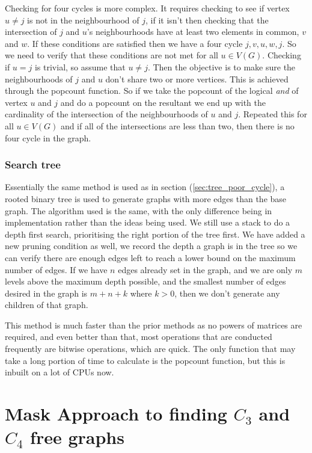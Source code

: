 \documentclass[a4paper]{article}
\begin{document}
Checking for four cycles is more complex. It requires checking to see if vertex $u\not= j$ is not in the neighbourhood of $j$, if it isn't then checking that the intersection of $j$ and $u$'s neighbourhoods have at least two elements in common, $v$ and $w$. If these conditions are satisfied then we have a four cycle $j,v,u,w,j$. So we need to verify that these conditions are not met for all $u\in V(G)$. Checking if $u=j$ is trivial, so assume that $u\not= j$. Then the objective is to make sure the neighbourhoods of $j$ and $u$ don't share two or more vertices. This is achieved through the popcount function. So if we take the popcount of the logical \emph{and} of vertex $u$ and $j$ and do a popcount on the resultant we end up with the cardinality of the intersection of the neighbourhoods of $u$ and $j$. Repeated this for all $u\in V(G)$ and if all of the intersections are less than two, then there is no four cycle in the graph.

\subsubsection{Search tree}
Essentially the same method is used as in section (\ref{sec:tree_poor_cycle}), a rooted binary tree is used to generate graphs with more edges than the base graph. The algorithm used is the same, with the only difference being in implementation rather than the ideas being used. We still use a stack to do a depth first search, prioritising the right portion of the tree first. We have added a new pruning condition as well, we record the depth a graph is in the tree so we can verify there are enough edges left to reach a lower bound on the maximum number of edges. If we have $n$ edges already set in the graph, and we are only $m$ levels above the maximum depth possible, and the smallest number of edges desired in the graph is $m+n+k$ where $k>0$, then we don't generate any children of that graph.

This method is much faster than the prior methods as no powers of matrices are required, and even better than that, most operations that are conducted frequently are bitwise operations, which are quick. The only function that may take a long portion of time to calculate is the popcount function, but this is inbuilt on a lot of CPUs now.

\section{Mask Approach to finding $C_3$ and $C_4$ free graphs}
\end{document}
